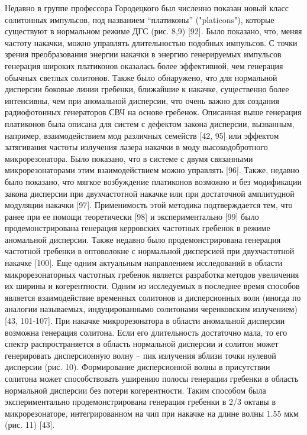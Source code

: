 Недавно в группе профессора Городецкого был численно показан новый класс солитонных импульсов, под названием “платиконы” ("platicons"), которые существуют в нормальном режиме ДГС (рис. 8,9) [92]. Было показано, что, меняя частоту накачки, можно управлять длительностью подобных импульсов. С точки зрения преобразования энергии накачки в энергию генерируемых импульсов генерация широких платиконов оказалась более эффективной, чем генерация обычных светлых солитонов. Также было обнаружено, что для нормальной дисперсии боковые линии гребенки, ближайшие к накачке, существенно более интенсивны, чем при аномальной дисперсии, что очень важно для создания радиофотонных генераторов СВЧ на основе гребенок. Описанная выше генерация платиконов была описана для систем с дефектом закона дисперсии, вызванным, например, взаимодействием мод различных семейств [42, 95] или эффектом затягивания частоты излучения лазера накачки в моду высокодобротного микрорезонатора. Было показано, что в системе с двумя связанными микрорезонаторами этим взаимодействием можно управлять [96]. Также, недавно было показано, что мягкое возбуждение платиконов возможно и без модификации закона дисперсии при двухчастотной накачке или при достаточной амплитудной модуляции накачки [97]. Применимость этой методика подтверждается тем, что ранее при ее помощи теоретически [98] и экспериментально [99] было продемонстрирована генерация керровских частотных гребенок в режиме аномальной дисперсии. Также недавно было продемонстрирована генерация частотной гребенки в оптоволокне с нормальной дисперсией при двухчастотной накачке [100].
Еще одним актуальным направлением исследований в области микрорезонаторных частотных гребенок является разработка методов увеличения их ширины и когерентности. Одним из исследуемых в последнее время способов является взаимодействие временных солитонов и дисперсионных волн (иногда по аналогии называемых, индуцированнымо солитонами черенковским излучением) [43, 101-107]. При накачке микрорезонатора в области аномальной дисперсии возможна генерация солитона. Если его длительность достаточно мала, то его спектр распространяется в область нормальной дисперсии и солитон может генерировать дисперсионную волну – пик излучения вблизи точки нулевой дисперсии (рис. 10). Формирование дисперсионной волны в присутствии солитона может способствовать уширению полосы генерации гребенки в область нормальной дисперсии без потери когерентности. Таким способом была экспериментально продемонстрирована генерация гребенки в 2/3 октавы в микрорезонаторе, интегрированном на чип при накачке на длине волны 1.55 мкм (рис. 11) [43].
